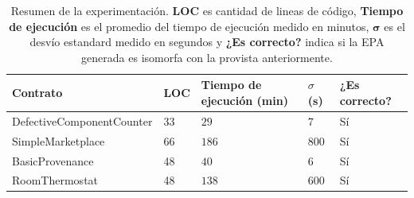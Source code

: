 \begin{table}
    \caption{Resumen de la experimentación. \textbf{LOC} es cantidad de lineas de código, \textbf{Tiempo de ejecución} es el promedio del tiempo de ejecución medido en minutos, $\boldsymbol{\sigma}$ es el desvío estandard medido en segundos y \textbf{¿Es correcto?} indica si la EPA generada es isomorfa con la provista anteriormente.}\label{tab:resultados}
    \begin{tabular}{|l|l|l|l|l|}
        \hline
        Contrato                  & LOC & Tiempo de ejecución (min) & $\sigma$ (s) & ¿Es correcto? \\
        \hline
        DefectiveComponentCounter & 33  & $29$                      & $7$          & Sí            \\
        SimpleMarketplace         & 66  & $186$                     & $800$        & Sí            \\
        BasicProvenance           & 48  & $40$                      & $6$          & Sí            \\
        RoomThermostat            & 48  & $138$                     & $600$        & Sí            \\
        \hline
    \end{tabular}
\end{table}
